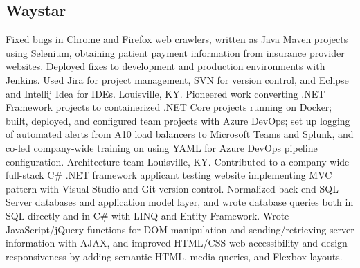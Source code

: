 \subsection{Waystar}
{Fixed bugs in Chrome and Firefox web crawlers, written as Java Maven projects using Selenium, obtaining patient payment information from insurance provider websites. Deployed fixes to development and production environments with Jenkins. Used Jira for project management, SVN for version control, and Eclipse and Intellij Idea for IDEs.
}
{Louisville, KY. Pioneered work converting .NET Framework projects to containerized .NET Core projects running on Docker; built, deployed, and configured team projects with Azure DevOps; set up logging of automated alerts from A10 load balancers to Microsoft Teams and Splunk, and co-led company-wide training on using YAML for Azure DevOps pipeline configuration.
}
{Architecture team}
{}
{Louisville, KY. Contributed to a company-wide full-stack C\# .NET framework applicant testing website implementing MVC pattern with Visual Studio and Git version control. Normalized back-end SQL Server databases and application model layer, and wrote database queries both in SQL directly and in C\# with LINQ and Entity Framework. Wrote JavaScript/jQuery functions for DOM manipulation and sending/retrieving server information with AJAX, and improved HTML/CSS web accessibility and design responsiveness by adding semantic HTML, media queries, and Flexbox layouts. }
